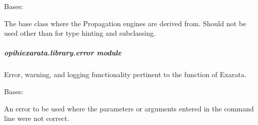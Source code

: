 \documentclass[letterpaper,11pt,english]{sphinxmanual}
\begin{document}
\begin{savenotes}\begin{fulllineitems}
\label{\detokenize{code/opihiexarata.library.engine:opihiexarata.library.engine.PropagationEngine}}
\pysigstartsignatures
{}
\pysigstopsignatures
\sphinxAtStartPar
Bases: {\hyperref[\detokenize{code/opihiexarata.library.engine:opihiexarata.library.engine.ExarataEngine}]{}}

\sphinxAtStartPar
The base class where the Propagation engines are derived from. Should
not be used other than for type hinting and subclassing.

\end{fulllineitems}\end{savenotes}


\sphinxstepscope


\subparagraph{opihiexarata.library.error module}
\label{\detokenize{code/opihiexarata.library.error:module-opihiexarata.library.error}}\label{\detokenize{code/opihiexarata.library.error:opihiexarata-library-error-module}}\label{\detokenize{code/opihiexarata.library.error::doc}}
\sphinxAtStartPar
Error, warning, and logging functionality pertinent to the function of Exarata.

\begin{savenotes}\begin{fulllineitems}
\label{\detokenize{code/opihiexarata.library.error:opihiexarata.library.error.CommandLineError}}
\pysigstartsignatures
{}
\pysigstopsignatures
\sphinxAtStartPar
Bases: {\hyperref[\detokenize{code/opihiexarata.library.error:opihiexarata.library.error.ExarataException}]{}}

\sphinxAtStartPar
An error to be used where the parameters or arguments entered in the
command line were not correct.

\end{fulllineitems}\end{savenotes}
\end{document}
